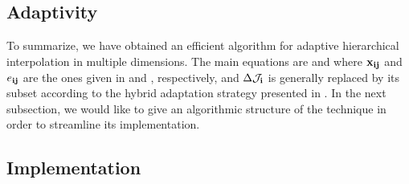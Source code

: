 \subsection{Adaptivity} 


To summarize, we have obtained an efficient algorithm for adaptive hierarchical
interpolation in multiple dimensions. The main equations are  and
 where $\mathbf{x}_{\mathbf{i}\mathbf{j}}$ and $e_{\mathbf{i}\mathbf{j}}$ are the ones
given in  and , respectively, and
$\Delta\mathcal{J}_{\mathbf{i}}$ is generally replaced by its subset according to the hybrid
adaptation strategy presented in . In the next subsection, we
would like to give an algorithmic structure of the technique in order to
streamline its implementation.

\subsection{Implementation} 

